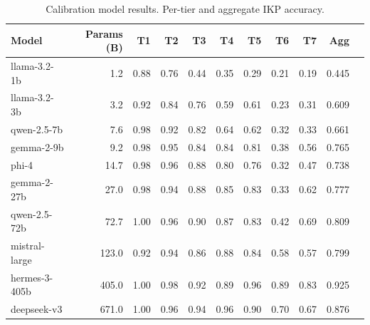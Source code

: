 \begin{table}[t]
\centering
\caption{Calibration model results. Per-tier and aggregate IKP accuracy.}
\label{tab:calibration}
\small
\begin{tabular}{lrrrrrrrrrr}
\toprule
Model & Params (B) & T1 & T2 & T3 & T4 & T5 & T6 & T7 & Agg \\
\midrule
llama-3.2-1b & 1.2 & 0.88 & 0.76 & 0.44 & 0.35 & 0.29 & 0.21 & 0.19 & 0.445 \\
llama-3.2-3b & 3.2 & 0.92 & 0.84 & 0.76 & 0.59 & 0.61 & 0.23 & 0.31 & 0.609 \\
qwen-2.5-7b & 7.6 & 0.98 & 0.92 & 0.82 & 0.64 & 0.62 & 0.32 & 0.33 & 0.661 \\
gemma-2-9b & 9.2 & 0.98 & 0.95 & 0.84 & 0.84 & 0.81 & 0.38 & 0.56 & 0.765 \\
phi-4 & 14.7 & 0.98 & 0.96 & 0.88 & 0.80 & 0.76 & 0.32 & 0.47 & 0.738 \\
gemma-2-27b & 27.0 & 0.98 & 0.94 & 0.88 & 0.85 & 0.83 & 0.33 & 0.62 & 0.777 \\
qwen-2.5-72b & 72.7 & 1.00 & 0.96 & 0.90 & 0.87 & 0.83 & 0.42 & 0.69 & 0.809 \\
mistral-large & 123.0 & 0.92 & 0.94 & 0.86 & 0.88 & 0.84 & 0.58 & 0.57 & 0.799 \\
hermes-3-405b & 405.0 & 1.00 & 0.98 & 0.92 & 0.89 & 0.96 & 0.89 & 0.83 & 0.925 \\
deepseek-v3 & 671.0 & 1.00 & 0.96 & 0.94 & 0.96 & 0.90 & 0.70 & 0.67 & 0.876 \\
\bottomrule
\end{tabular}
\end{table}